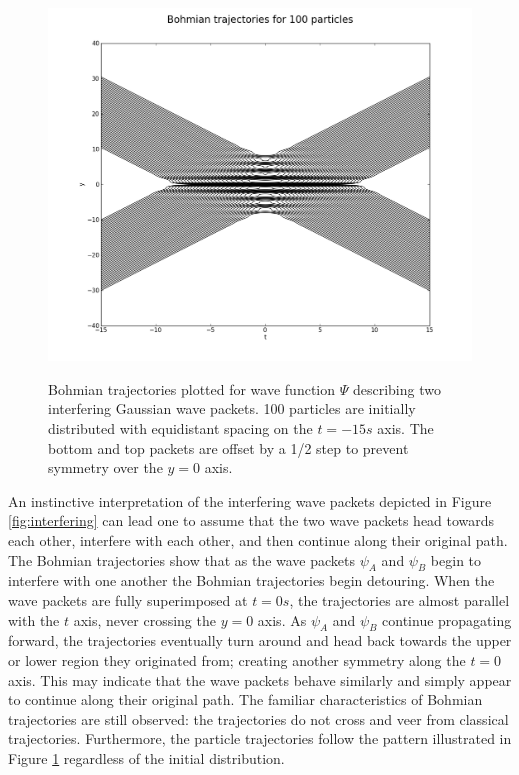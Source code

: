\documentclass[10pt, reqno]{article}
\begin{document}
  \begin{figure}[ht]
    {\centering \includegraphics[scale=.5]{./imgs/100-bohmian-trajectories-b06f0d2cb50ffe27.png} \\}
    \caption{
      Bohmian trajectories plotted for wave function $\Psi$ describing two interfering Gaussian wave packets.
      100 particles are initially distributed with equidistant spacing on the $t=-15s$ axis.
      The bottom and top packets are offset by a 1/2 step to prevent symmetry over the $y=0$ axis.
    }
    \label{fig:interfering-trajectories}
  \end{figure}

  An instinctive interpretation of the interfering wave packets depicted in Figure \ref{fig:interfering} can lead one to assume that the two wave packets 
    head towards each other, interfere with each other, and then continue along their original path.
  The Bohmian trajectories show that as the wave packets $\psi_A$ and $\psi_B$ begin to interfere with one another the Bohmian trajectories begin detouring.
  When the wave packets are fully superimposed at $t=0s$, the trajectories are almost parallel with the $t$ axis, never crossing the $y=0$ axis. 
  As $\psi_A$ and $\psi_B$ continue propagating forward, the trajectories eventually turn around and head back towards the upper or lower region they originated from;
    creating another symmetry along the $t=0$ axis.
  This may indicate that the wave packets behave similarly and simply appear to continue along their original path.
  The familiar characteristics of Bohmian trajectories are still observed: the trajectories do not cross and veer from classical trajectories.
  Furthermore, the particle trajectories follow the pattern illustrated in Figure \ref{fig:interfering-trajectories} regardless of the initial distribution.
\end{document}
